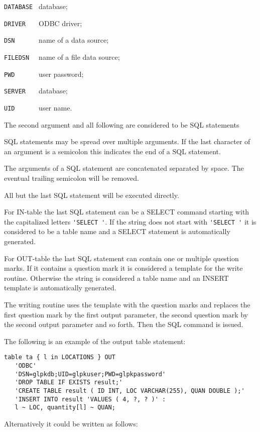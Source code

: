 \documentclass[11pt,draft]{article}
\begin{document}
\verb|DATABASE | database;

\verb|DRIVER   | ODBC driver;

\verb|DSN      | name of a data source;

\verb|FILEDSN  | name of a file data source;

\verb|PWD      | user password;

\verb|SERVER   | database;

\verb|UID      | user name.

The second argument and all following are considered to be SQL
statements

SQL statements may be spread over multiple arguments.  If the last
character of an argument is a semicolon this indicates the end of
a SQL statement.

The arguments of a SQL statement are concatenated separated by space.
The eventual trailing semicolon will be removed.

All but the last SQL statement will be executed directly.

For IN-table the last SQL statement can be a SELECT command starting
with the capitalized letters \verb|'SELECT '|. If the string does not
start with \verb|'SELECT '| it is considered to be a table name and a
SELECT statement is automatically generated.

For OUT-table the last SQL statement can contain one or multiple
question marks. If it contains a question mark it is considered a
template for the write routine. Otherwise the string is considered a
table name and an INSERT template is automatically generated.

The writing routine uses the template with the question marks and
replaces the first question mark by the first output parameter, the
second question mark by the second output parameter and so forth. Then
the SQL command is issued.

The following is an example of the output table statement:

\begin{small}
\begin{verbatim}
table ta { l in LOCATIONS } OUT
   'ODBC'
   'DSN=glpkdb;UID=glpkuser;PWD=glpkpassword'
   'DROP TABLE IF EXISTS result;'
   'CREATE TABLE result ( ID INT, LOC VARCHAR(255), QUAN DOUBLE );'
   'INSERT INTO result 'VALUES ( 4, ?, ? )' :
   l ~ LOC, quantity[l] ~ QUAN;
\end{verbatim}
\end{small}

\noindent
Alternatively it could be written as follows:
\end{document}
